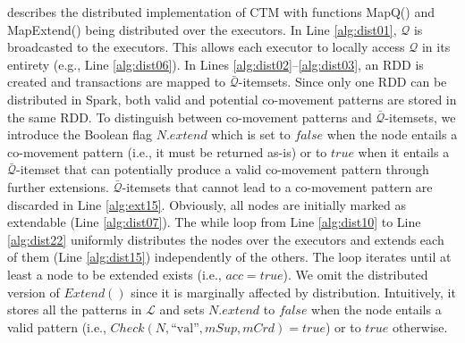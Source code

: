 \documentclass[preprint,12pt,authoryear]{elsarticle} %
\renewcommand{\sf}[1]{\textsf{\textup{#1}}}
\begin{document}
 describes the distributed implementation of CTM with functions \sf{MapQ()} and \sf{MapExtend()} being distributed over the executors.
In Line \ref{alg:dist01}, $\mathcal{Q}$ is broadcasted to the executors.
This allows each executor to locally access $\mathcal{Q}$ in its entirety (e.g., Line \ref{alg:dist06}).
In Lines \ref{alg:dist02}--\ref{alg:dist03}, an RDD is created and transactions are mapped to $\bar{\mathcal{Q}}$-itemsets.
Since only one RDD can be distributed in Spark, both valid and potential co-movement patterns are stored in the same RDD.
To distinguish between co-movement patterns and $\bar{\mathcal{Q}}$-itemsets, we introduce the Boolean flag $N.extend$ which is set to $false$ when the node entails a co-movement pattern (i.e., it must be returned as-is) or to $true$ when it entails a $\bar{\mathcal{Q}}$-itemset that can potentially produce a valid co-movement pattern through further extensions. $\bar{\mathcal{Q}}$-itemsets that cannot lead to a co-movement pattern are discarded in  Line \ref{alg:ext15}.
Obviously, all nodes are initially marked as extendable (Line \ref{alg:dist07}). 
The \sf{while} loop from Line \ref{alg:dist10} to Line \ref{alg:dist22} uniformly distributes the nodes over the executors and extends each of them (Line \ref{alg:dist15}) independently of the others.
The loop iterates until at least a node to be extended exists (i.e., $acc=true$).
We omit the distributed version of $Extend()$ since it is marginally affected by distribution.
Intuitively, it stores all the patterns in $\mathcal{L}$ and sets $N.extend$ to $false$ when the node entails a valid pattern (i.e.,  $Check(N,\text{``val''},mSup,mCrd)=true$) or to $true$ otherwise.
\end{document}
